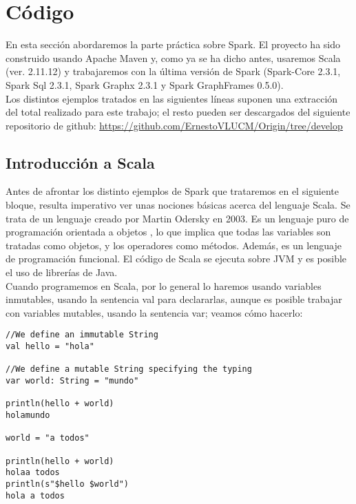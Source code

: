 \chapter{Código}

En esta sección abordaremos la parte práctica sobre Spark. El proyecto ha sido construido usando Apache Maven y, como ya se ha dicho antes, usaremos Scala (ver. 2.11.12) y trabajaremos con la última versión de Spark (Spark-Core 2.3.1, Spark Sql 2.3.1, Spark Graphx 2.3.1 y Spark GraphFrames 0.5.0).\\

Los distintos ejemplos tratados en las siguientes líneas suponen una extracción del total realizado para este trabajo; el resto pueden ser descargados del siguiente repositorio de  github: \textcolor{blue}{\underline{\url{https://github.com/ErnestoVLUCM/Origin/tree/develop}}} 

\section{Introducción a Scala}

Antes de afrontar los distinto ejemplos de Spark que trataremos en el siguiente bloque, resulta imperativo ver unas nociones básicas acerca del lenguaje Scala. Se trata de un lenguaje creado por Martin Odersky en 2003. Es un lenguaje puro de programación orientada a objetos \cite{scalaCoockbook}, lo que implica que todas las variables son tratadas como objetos, y los operadores como métodos. Además, es un lenguaje de programación funcional. El código de Scala se ejecuta sobre JVM y es posible el uso de librerías de Java.\\

Cuando programemos en Scala, por lo general lo haremos usando variables inmutables, usando la sentencia val para declararlas, aunque es posible trabajar con variables mutables, usando la sentencia var; veamos cómo hacerlo:\\

\begin{lstlisting}[frame=single]
//We define an immutable String
val hello = "hola"

//We define a mutable String specifying the typing
var world: String = "mundo"

println(hello + world)
holamundo

world = "a todos"

println(hello + world)
holaa todos
println(s"$hello $world")
hola a todos
\end{lstlisting}


